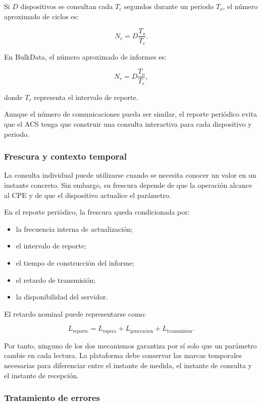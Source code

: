 Si \(D\) dispositivos se consultan cada \(T_c\) segundos durante un
periodo \(T_o\), el número aproximado de ciclos es:

\[
    N_c
    =
    D
    \frac{
        T_o
    }{
        T_c
    }.
\]

En BulkData, el número aproximado de informes es:

\[
    N_r
    =
    D
    \frac{
        T_o
    }{
        T_r
    },
\]

donde \(T_r\) representa el intervalo de reporte.

Aunque el número de comunicaciones pueda ser similar, el reporte
periódico evita que el ACS tenga que construir una consulta interactiva
para cada dispositivo y periodo.


\subsubsection*{Frescura y contexto temporal}

La consulta individual puede utilizarse cuando se necesita conocer un
valor en un instante concreto. Sin embargo, su frescura depende de que la
operación alcance al CPE y de que el dispositivo actualice el parámetro.

En el reporte periódico, la frescura queda condicionada por:

\begin{itemize}
    \item la frecuencia interna de actualización;
    \item el intervalo de reporte;
    \item el tiempo de construcción del informe;
    \item el retardo de transmisión;
    \item la disponibilidad del servidor.
\end{itemize}

El retardo nominal puede representarse como:

\[
    L_{\mathrm{reporte}}
    =
    L_{\mathrm{espera}}
    +
    L_{\mathrm{generacion}}
    +
    L_{\mathrm{transmision}}.
\]

Por tanto, ninguno de los dos mecanismos garantiza por sí solo que un
parámetro cambie en cada lectura. La plataforma debe conservar las marcas
temporales necesarias para diferenciar entre el instante de medida, el
instante de consulta y el instante de recepción.


\subsubsection*{Tratamiento de errores}


